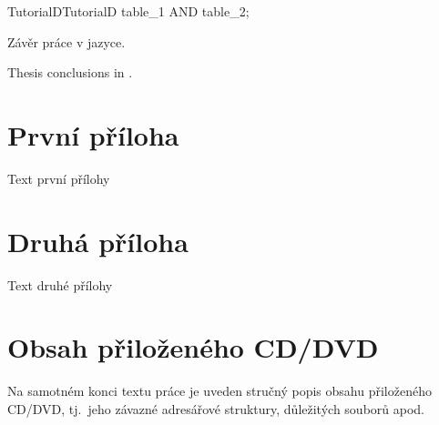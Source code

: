 \documentclass[
  biblatex,
  glossaries,
  index
]{kidiplom}
\begin{document}
\begin{kicode}{TutorialD}{}{TutorialD}
  table_1 AND table_2;
\end{kicode}

\begin{kiconclusions}
  Závěr práce v  jazyce.
\end{kiconclusions}

\begin{kiconclusions}[english]
  Thesis conclusions in .
\end{kiconclusions}

\appendix

\section{První příloha}
Text první přílohy

\section{Druhá příloha}
Text druhé přílohy

\section{Obsah přiloženého CD/DVD} \label{sec:ObsahCD}

Na samotném konci textu práce je uveden stručný popis obsahu
přiloženého CD/DVD, tj.~jeho závazné adresářové struktury, důležitých
souborů apod.
\end{document}
